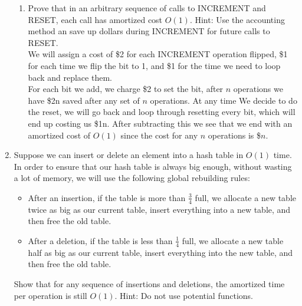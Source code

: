 \documentclass{article}
\begin{document}
\begin{enumerate}
\begin{enumerate}
\item Prove that in an arbitrary sequence of calls to INCREMENT and RESET, each call has amortized cost $O(1)$. Hint: Use the accounting method an save up dollars during INCREMENT for future calls to RESET. \\

We will assign a cost of \$2 for each INCREMENT operation flipped, \$1 for each time we flip the bit to 1, and \$1 for the time we need to loop back and replace them. \\
\newline 
For each bit we add, we charge \$2 to set the bit, after $n$ operations we have \$2n saved after any set of $n$ operations. At any time We decide to do the reset, we will go back and loop through resetting every bit, which will end up costing us \$1n. After subtracting this we see that we end with an amortized cost of $O(1)$ since the cost for any $n$ operations is \$$n$.
\end{enumerate}







\item Suppose we can insert or delete an element into a hash table in $O(1)$ time. In order to ensure that our hash table is always big enough, without wasting a lot of memory, we will use the following global rebuilding rules: 
\begin{itemize}
\item After an insertion, if the table is more than $\frac{3}{4}$ full, we allocate a new table twice as big as our current table, insert everything into a new table, and then free the old table. 
\item After a deletion, if the table is less than $\frac{1}{4}$ full, we allocate a new table half as big as our current table, insert everything into the new table, and then free the old table. 
\end{itemize}
Show that for any sequence of insertions and deletions, the amortized time per operation is still $O(1)$. Hint: Do not use potential functions. \\


\end{enumerate}
\end{document}
